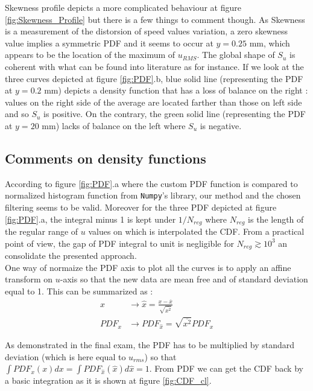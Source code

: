 \documentclass[12pt]{article}
\begin{document}
Skewness profile depicts a more complicated behaviour at figure \ref{fig:Skewness_Profile} but there is a few things to comment though. As Skewness is a measurement of the distorsion of speed values variation, a zero skewness value implies a symmetric PDF and it seems to occur at $y = 0.25$ \si{mm}, which appears to be the location of the maximum of $u_{RMS}$. The global shape of $S_u$ is coherent with what can be found into literature as \cite{mathisRelationshipVelocitySkewness2011} for instance. If we look at the three curves depicted at figure \ref{fig:PDF}.b, blue solid line (representing the PDF at $y=0.2$ \si{mm}) depicts a density function that has a loss of balance on the right : values on the right side of the average are located farther than those on left side and so $S_u$ is positive. On the contrary, the green solid line (representing the PDF at $y=20$ \si{mm}) lacks of balance on the left where $S_u$ is negative.\\

\subsection{Comments on density functions}

According to figure \ref{fig:PDF}.a where the custom PDF function is compared to normalized histogram function from \verb|Numpy|'s library, our method and the chosen filtering seems to be valid. Moreover for the three PDF depicted at figure \ref{fig:PDF}.a, the integral minus 1 is kept under $1/N_{reg}$ where $N_{reg}$ is the length of the regular range of $u$ values on which is interpolated the CDF. From a practical point of view, the gap of PDF integral to unit is negligible for $N_{reg} \gtrsim 10^3$ an consolidate the presented approach.\\

One way of normaize the PDF axis to plot all the curves is to apply an affine transform on $u$-axis so that the new data are mean free and of standard deviation equal to 1. This can be summarized as :
\begin{align}
    x &\rightarrow \hat{x} = \frac{x - \overline{x}}{\sqrt{\overline{x^2}}} \\
    PDF_x & \rightarrow PDF_{\hat{x}} = \sqrt{\overline{x^2}} PDF_x
\end{align}

As demonstrated in the final exam, the PDF has to be multiplied by standard deviation (which is here equal to $u_{rms}$) so that $\int PDF_x(x) dx = \int PDF_{\hat{x}}(\hat{x}) d\hat{x} = 1$. From PDF we can get the CDF back by a basic integration as it is shown at figure \ref{fig:CDF_cl}.\\
\end{document}
